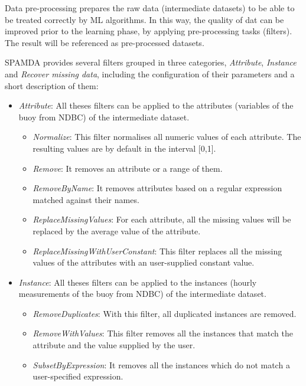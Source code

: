 \documentclass[review]{elsarticle}
\begin{document}
				Data pre-processing prepares the raw data (intermediate datasets) to be able to be treated correctly by ML algorithms. In this way, the quality of dat can be improved prior to the learning phase, by applying pre-processing tasks (filters). The result will be referenced as pre-processed datasets.
				
				SPAMDA provides several filters grouped in three categories, \textit{Attribute}, \textit{Instance} and \textit{Recover missing data}, including the configuration of their parameters and a short description of them:
				
				\begin{itemize}

				 \item \textit{Attribute}: All theses filters can be applied to the attributes (variables of the buoy from NDBC) of the intermediate dataset.
				 
					\begin{itemize}
						\item \textit{Normalize}: This filter normalises all numeric values of each attribute. The resulting values are by default in the interval [0,1].
						\item \textit{Remove}: It removes an attribute or a range of them.
						\item \textit{RemoveByName}: It removes attributes based on a regular expression matched against their names.
						\item \textit{ReplaceMissingValues}: For each attribute, all the missing values will be replaced by the average value of the attribute.
						\item \textit{ReplaceMissingWithUserConstant}: This filter replaces all the missing values of the attributes with an user-supplied constant value.
					\end{itemize}
				 
				 \item \textit{Instance}: All theses filters can be applied to the instances (hourly measurements of the buoy from NDBC) of the intermediate dataset.
					\begin{itemize}
						\item \textit{RemoveDuplicates}: With this filter, all duplicated instances are removed.
						\item \textit{RemoveWithValues}: This filter removes all the instances that match the attribute and the value supplied by the user.
						\item \textit{SubsetByExpression}: It removes all the instances which do not match a user-specified expression.
					\end{itemize}
				 

\end{itemize}
\end{document}
